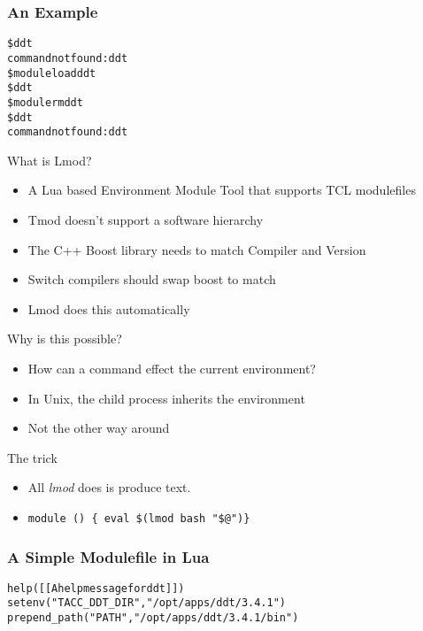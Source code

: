 \documentclass{beamer}
\begin{document}
\begin{frame}[fragile]
    \frametitle{An Example}
    {\small
      \begin{alltt}
          \$ {\color{blue} ddt}
          command not found: ddt
          \$ {\color{blue} module load ddt}
          \$ {\color{blue} ddt }
          \$ {\color{blue} module rm ddt}
          \$ {\color{blue} ddt}
          command not found: ddt
      \end{alltt}
    }
\end{frame}    

\begin{frame}{What is Lmod?}
  \begin{itemize}
    \item A Lua based Environment Module Tool that supports TCL modulefiles
    \item Tmod doesn't support a software hierarchy
    \item The C++ Boost library needs to match Compiler and Version
    \item Switch compilers should swap boost to match
    \item Lmod does this automatically
  \end{itemize}
\end{frame}

\begin{frame}{Why is this possible?}
  \begin{itemize}
    \item How can a command effect the current environment?
    \item In Unix, the child process inherits the environment
    \item Not the other way around
  \end{itemize}
\end{frame}

\begin{frame}{The trick}
  \begin{itemize}
    \item All \emph{lmod} does is produce text.
    \item \texttt{module () \{ eval \$(lmod bash "\$@")\}}
  \end{itemize}
\end{frame}


\begin{frame}[fragile]
    \frametitle{A Simple Modulefile in Lua}
    {\small
      \begin{alltt}
          help([[A help message for ddt]])
          setenv("TACC_DDT_DIR", "/opt/apps/ddt/3.4.1")
          prepend_path("PATH",   "/opt/apps/ddt/3.4.1/bin")
      \end{alltt}
    }
\end{frame}    
\end{document}
